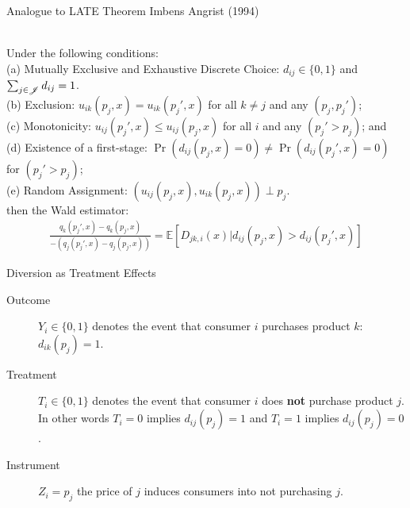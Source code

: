 \documentclass[aspectratio=169,10pt]{beamer}
\begin{document}
\begin{frame}{Analogue to LATE Theorem Imbens Angrist (1994)}
\begin{theorem}\ \\
\label{prop:late}
Under the following conditions:\\ 
(a) Mutually Exclusive and Exhaustive Discrete Choice: $d_{ij} \in \{0,1\}$ and $\sum_{j \in \mathscr{J}} d_{ij}=1$.\\
(b) Exclusion: $u_{ik}(p_j,x)=u_{ik}(p_j',x)$ for all $k \neq j$ and any $(p_j, p_j')$; \\
(c) Monotonicity: $u_{ij}(p_j',x) \leq u_{ij}(p_j,x)$ for all $i$ and any $(p_j' > p_{j})$; and \\
(d) Existence of a first-stage: $\Pr(d_{ij}(p_j,x)=0) \neq \Pr(d_{ij}(p_j',x)=0) $ for $(p_j' > p_{j})$; \\
(e) Random Assignment: $(u_{ij}(p_j,x),u_{ik}(p_j,x)) \perp p_j$. \\
\noindent
then the Wald estimator:
\begin{align*}
 \frac{q_k(p_j',x) - q_k(p_j,x)}{-\left(q_j(p_j',x) - q_j(p_j,x)\right)}=\mathbb{E}[D_{jk,i}(x) | d_{ij}(p_j,x) > d_{ij}(p_j',x)]
\end{align*}
\end{theorem}
\end{frame}

\begin{frame}{Diversion as Treatment Effects}
\begin{description}
\item[Outcome] $Y_i \in \{0,1\}$ denotes the event that consumer $i$ purchases product $k$: $d_{ik}(p_j)=1$.
\item[Treatment] $T_i \in \{0,1\}$ denotes the event that consumer $i$ does \textbf{not} purchase product $j$. In other words $T_i = 0$ implies $d_{ij}(p_j)=1$ and $T_i=1$ implies $d_{ij}(p_j)=0$.
\item[Instrument] $Z_i = p_j$ the price of $j$ induces consumers into not purchasing $j$.
\end{description}
\end{frame}
\end{document}
